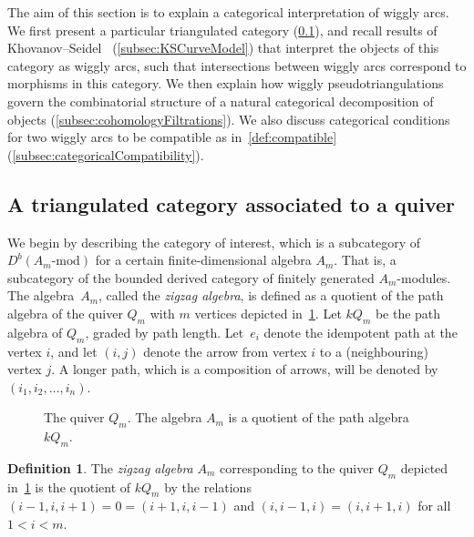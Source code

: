 \documentclass{amsart}
\theoremstyle{definition}
\newtheorem{definition}[theorem]{Definition}
\newcommand{\darkblue}{\color{darkblue}} %
\newcommand{\defn}[1]{\textsl{\darkblue #1}} %
\begin{document}
The aim of this section is to explain a categorical interpretation of wiggly arcs.
We first present a particular triangulated category (\cref{subsec:category}), and recall results of Khovanov--Seidel~\cite{kho.sei:02} (\cref{subsec:KSCurveModel}) that interpret the objects of this category as wiggly arcs, such that intersections between wiggly arcs correspond to morphisms in this category.
We then explain how wiggly pseudotriangulations govern the combinatorial structure of a natural categorical decomposition of objects (\cref{subsec:cohomologyFiltrations}).
We also discuss categorical conditions for two wiggly arcs to be compatible as in~\cref{def:compatible} (\cref{subsec:categoricalCompatibility}).


\subsection{A triangulated category associated to a quiver}
\label{subsec:category}

We begin by describing the category of interest, which is a subcategory of \(D^b(A_m\text{-mod})\) for a certain finite-dimensional algebra \(A_m\).
That is, a subcategory of the bounded derived category of finitely generated \(A_m\)-modules.
The algebra~\(A_m\), called the \defn{zigzag algebra}, is defined as a quotient of the path algebra of the quiver \(Q_m\) with \(m\) vertices depicted in~\cref{fig:am-quiver}.
Let \(kQ_m\) be the path algebra of \(Q_m\), graded by path length.
Let~\(e_i\) denote the idempotent path at the vertex \(i\), and let \((i, j)\) denote the arrow from vertex \(i\) to a (neighbouring) vertex \(j\).
A longer path, which is a composition of arrows, will be denoted by~\((i_1, i_2, \dots, i_n)\).

\begin{figure}
	\centering
	\caption{The quiver \(Q_m\). The algebra \(A_m\) is a quotient of the path algebra \(kQ_m\).}
	\label{fig:am-quiver}
\end{figure}

\begin{definition}
The \defn{zigzag algebra} \(A_m\) corresponding to the quiver \(Q_m\) depicted in~\cref{fig:am-quiver} is the quotient of \(kQ_m\) by the relations \((i-1, i, i+1) = 0 = (i+1, i, i-1)\) and \((i, i-1, i) = (i, i+1, i)\) for all~\(1 < i < m\).
\end{definition}
\end{document}
